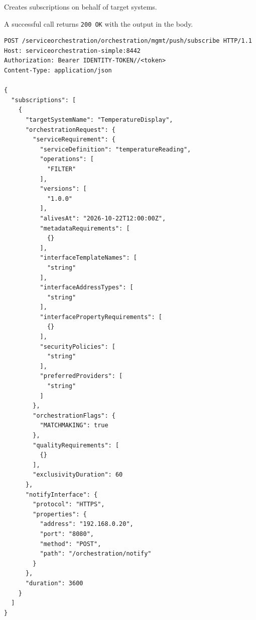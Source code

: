 \documentclass[a4paper]{arrowhead}
\newcommand{\oref}[1]{{\textcolor{ArrowheadBlue}{\hyperref[sec:operations:#1]{#1}}}}
\begin{document}
Creates subscriptions on behalf of target systems.

A successful call returns \texttt{200 OK} with the output in the body.

\begin{lstlisting}[label={lst:subscribe},caption={An \oref{subscribe} invocation.}]
POST /serviceorchestration/orchestration/mgmt/push/subscribe HTTP/1.1
Host: serviceorchestration-simple:8442
Authorization: Bearer IDENTITY-TOKEN//<token>
Content-Type: application/json

{
  "subscriptions": [
    {
      "targetSystemName": "TemperatureDisplay",
      "orchestrationRequest": {
        "serviceRequirement": {
          "serviceDefinition": "temperatureReading",
          "operations": [
            "FILTER"
          ],
          "versions": [
            "1.0.0"
          ],
          "alivesAt": "2026-10-22T12:00:00Z",
          "metadataRequirements": [
            {}
          ],
          "interfaceTemplateNames": [
            "string"
          ],
          "interfaceAddressTypes": [
            "string"
          ],
          "interfacePropertyRequirements": [
            {}
          ],
          "securityPolicies": [
            "string"
          ],
          "preferredProviders": [
            "string"
          ]
        },
        "orchestrationFlags": {
          "MATCHMAKING": true
        },
        "qualityRequirements": [
          {}
        ],
        "exclusivityDuration": 60
      },
      "notifyInterface": {
        "protocol": "HTTPS",
        "properties": {
          "address": "192.168.0.20",
          "port": "8080",
          "method": "POST",
          "path": "/orchestration/notify"
        }
      },
      "duration": 3600
    }
  ]
}
\end{lstlisting}
\end{document}
